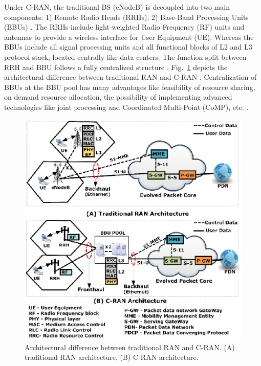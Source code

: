 \begin{multicols}{2}
Under C-RAN, the traditional BS (eNodeB) is decoupled into two main components: 1) Remote Radio Heads (RRHs), 2) Base-Band Processing Units (BBUs) \cite{art3-key05}. The RRHs include light-weighted Radio Frequency (RF) units and antennas to provide a wireless interface for User Equipment (UE). Whereas the BBUs include all signal processing units and all functional blocks of L2 and L3 protocol stack, located centrally like data centers. The function split between RRH
and BBU follows a fully centralized structure \cite{art3-key06}. Fig.~\ref{fig01} depicts the architectural difference between traditional RAN and C-RAN \cite{art3-key07}. Centralization of BBUs at the BBU pool has many advantages like feasibility of resource sharing, on demand resource allocation, the possibility of implementing advanced technologies like joint processing and Coordinated Multi-Point (CoMP), etc. \cite{art3-key08}.

\begin{figure}[H]
\centering
\includegraphics[scale=1.15]{src/Figures/chap3/fig01.jpg}
\caption{Architectural difference between traditional RAN and C-RAN. (A) traditional RAN architecture, (B) C-RAN architecture.}\label{fig01}
\vspace{-.5cm}
\end{figure}


\end{multicols}
